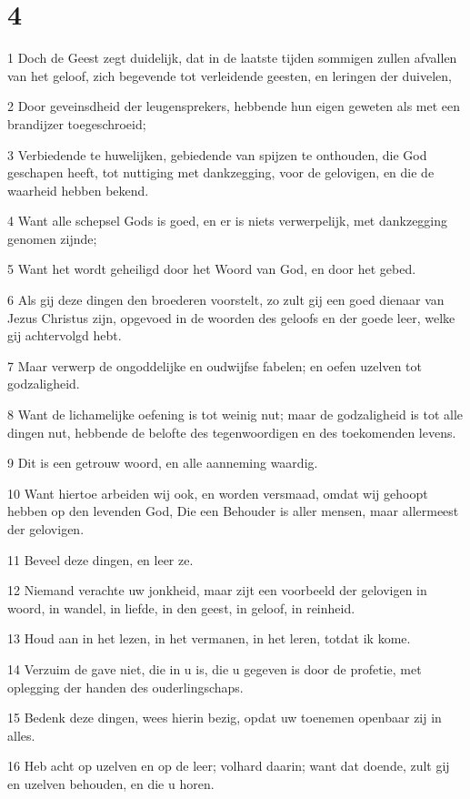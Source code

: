 \chapter{4}

\par 1 Doch de Geest zegt duidelijk, dat in de laatste tijden sommigen zullen afvallen van het geloof, zich begevende tot verleidende geesten, en leringen der duivelen,
\par 2 Door geveinsdheid der leugensprekers, hebbende hun eigen geweten als met een brandijzer toegeschroeid;
\par 3 Verbiedende te huwelijken, gebiedende van spijzen te onthouden, die God geschapen heeft, tot nuttiging met dankzegging, voor de gelovigen, en die de waarheid hebben bekend.
\par 4 Want alle schepsel Gods is goed, en er is niets verwerpelijk, met dankzegging genomen zijnde;
\par 5 Want het wordt geheiligd door het Woord van God, en door het gebed.
\par 6 Als gij deze dingen den broederen voorstelt, zo zult gij een goed dienaar van Jezus Christus zijn, opgevoed in de woorden des geloofs en der goede leer, welke gij achtervolgd hebt.
\par 7 Maar verwerp de ongoddelijke en oudwijfse fabelen; en oefen uzelven tot godzaligheid.
\par 8 Want de lichamelijke oefening is tot weinig nut; maar de godzaligheid is tot alle dingen nut, hebbende de belofte des tegenwoordigen en des toekomenden levens.
\par 9 Dit is een getrouw woord, en alle aanneming waardig.
\par 10 Want hiertoe arbeiden wij ook, en worden versmaad, omdat wij gehoopt hebben op den levenden God, Die een Behouder is aller mensen, maar allermeest der gelovigen.
\par 11 Beveel deze dingen, en leer ze.
\par 12 Niemand verachte uw jonkheid, maar zijt een voorbeeld der gelovigen in woord, in wandel, in liefde, in den geest, in geloof, in reinheid.
\par 13 Houd aan in het lezen, in het vermanen, in het leren, totdat ik kome.
\par 14 Verzuim de gave niet, die in u is, die u gegeven is door de profetie, met oplegging der handen des ouderlingschaps.
\par 15 Bedenk deze dingen, wees hierin bezig, opdat uw toenemen openbaar zij in alles.
\par 16 Heb acht op uzelven en op de leer; volhard daarin; want dat doende, zult gij en uzelven behouden, en die u horen.

